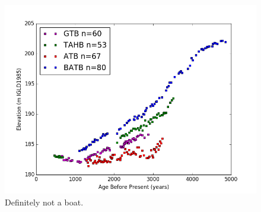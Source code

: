 \begin{figure}[h]
	\includegraphics[width=\linewidth]{data/theDataRaw.png}
	\caption{Definitely not a boat.}
	\label{fig:rawData}
\end{figure} 
